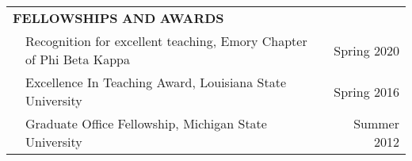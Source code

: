 \documentclass[10pt]{article}
\begin{document}
\begin{center}
\begin{tabular}{llllr}
\multicolumn{5}{l}{{\Large \textbf{F}}\textbf{ELLOWSHIPS} \textbf{AND}
{\Large \textbf{A}}\textbf{WARDS}} \vspace{0.1cm}\\
& \multicolumn{3}{l}{Recognition for excellent teaching, Emory Chapter of Phi Beta Kappa}& \multicolumn{1}{r}{Spring 2020} \\
& \multicolumn{3}{l}{Excellence In Teaching Award, Louisiana State University}& \multicolumn{1}{r}{Spring 2016} \\
& \multicolumn{3}{l}{Graduate Office Fellowship, Michigan State University}& \multicolumn{1}{r}{Summer 2012} \\

\end{tabular}
\end{center}
\end{document}
